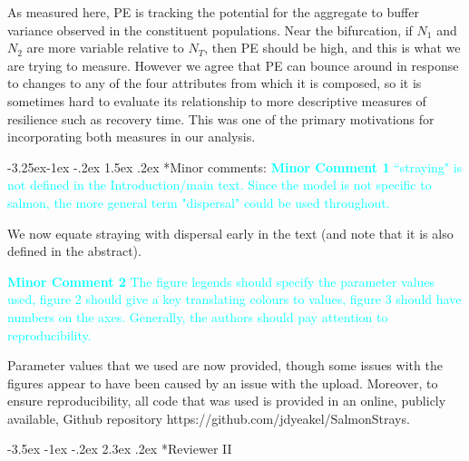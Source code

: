 \documentclass[ucm,12pt]{ucletter}
\makeatletter
\newcounter{section}
\newcounter{subsection}[section]
\renewcommand\section{\@startsection {section}{1}{\z@}%
                                   {-3.5ex \@plus -1ex \@minus -.2ex}%
                                   {2.3ex \@plus.2ex}%
                                   {\normalfont\Large\bfseries}}
\newcommand\subsection{\@startsection{subsection}{2}{\z@}%
                                     {-3.25ex\@plus -1ex \@minus -.2ex}%
                                     {1.5ex \@plus .2ex}%
                                     {\normalfont\large\bfseries}}
\makeatother
\begin{document}
\begin{letter}
 As measured here, PE is tracking the potential for the aggregate to buffer variance observed in the constituent populations. Near the bifurcation, if $N_1$ and $N_2$ are more variable relative to $N_T$, then PE should be high, and this is what we are trying to measure. However we agree that PE can bounce around in response to changes to any of the four attributes from which it is composed, so it is sometimes hard to evaluate its relationship to more descriptive measures of resilience such as recovery time. This was one of the primary motivations for incorporating both measures in our analysis.


\subsection*{Minor comments:}
\noindent \textcolor{cyan}{
{\bf Minor Comment 1} ``straying" is not defined in the Introduction/main text. Since the model is not specific to salmon, the more general term "dispersal" could be used throughout.}

 We now equate straying with dispersal early in the text (and note that it is also defined in the abstract).

\noindent \textcolor{cyan}{
{\bf Minor Comment 2} The figure legends should specify the parameter values used, figure 2 should give a key translating colours to values, figure 3 should have numbers on the axes. Generally, the authors should pay attention to reproducibility.}

 Parameter values that we used are now provided, though some issues with the figures appear to have been caused by an issue with the upload. Moreover, to ensure reproducibility, all code that was used is provided in an online, publicly available, Github repository https://github.com/jdyeakel/SalmonStrays.




\section*{Reviewer II}

\end{letter}
\end{document}
